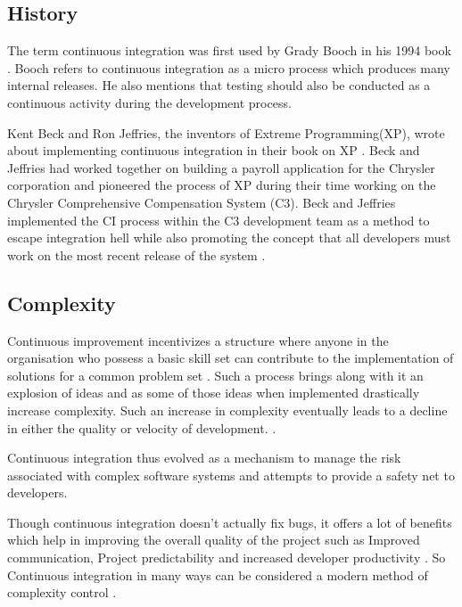\documentclass[12pt,conference]{IEEEtran}
\begin{document}
\subsection*{History}

The term continuous integration was first used by Grady Booch in his 1994 book \cite{booch_object-oriented_1994}. Booch refers to continuous integration as a micro process which produces many internal releases. He also mentions that testing should also be conducted as a continuous activity during the development process.

Kent Beck and Ron Jeffries, the inventors of Extreme Programming(XP), wrote about implementing continuous integration in their book on XP \cite{astesiano_fundamental_1998}. Beck and Jeffries had worked together on building a payroll application for the Chrysler corporation and pioneered the process of XP during their time working on the Chrysler Comprehensive Compensation System (C3). Beck and Jeffries implemented the CI process within the C3 development team as a method to escape integration hell while also promoting the concept that all developers must work on the most recent release of the system \cite{cunningham_cunningham_2011}.

\subsection*{Complexity}
Continuous improvement incentivizes a structure where anyone in the organisation who possess  a basic skill set can contribute to the implementation of solutions for a common problem set \cite{bessant_rediscovering_1994}. Such a process brings along with it an explosion of ideas and as some of those ideas when implemented drastically increase complexity. Such an increase in complexity eventually leads to a decline in either the quality or velocity of development. \cite{zaytsev_increasing_2013}. 

Continuous integration thus evolved as a mechanism to manage the risk associated with complex software systems \cite{zaytsev_increasing_2013} and  attempts to provide a safety net \cite{fowler_continuous_2006} to developers. 

Though continuous integration doesn't actually fix bugs, it offers a lot of benefits which help in improving the overall quality of the project such as Improved communication, Project predictability and increased developer productivity \cite{sta_ahl_experienced_2013}. So Continuous integration in many ways can be considered a modern method of complexity control \cite{beck_extreme_2000}.
\end{document}
